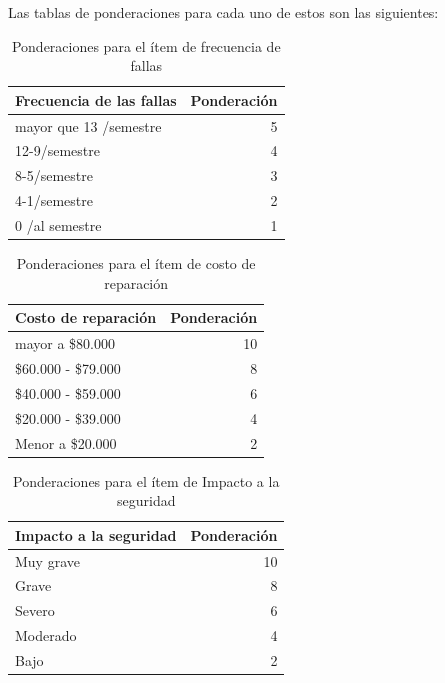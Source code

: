 Las tablas de ponderaciones para cada uno de estos son las siguientes:

\begin{table}[H]
  \centering
  
    \begin{tabular}{|l|r|}
    \hline
    Frecuencia de las fallas & \multicolumn{1}{l|}{Ponderación} \\
    \hline
    mayor que 13 /semestre & 5 \\
    \hline
    12-9/semestre & 4 \\
    \hline
    8-5/semestre & 3 \\
    \hline
    4-1/semestre & 2 \\
    \hline
    0 /al semestre & 1 \\
    \hline
    \end{tabular}%
    \caption{Ponderaciones para el ítem de frecuencia de fallas}
  \label{tab:addlabel}%
\end{table}%

\qquad\qquad%

\begin{table}[H]
  \centering
 
    \begin{tabular}{|l|r|}
    \hline
    Costo de reparación & \multicolumn{1}{l|}{Ponderación} \\
    \hline
    mayor a \$80.000 & 10 \\
    \hline
    \$60.000 - \$79.000 & 8 \\
    \hline
    \$40.000 - \$59.000 & 6 \\
    \hline
    \$20.000 - \$39.000 & 4 \\
    \hline
    Menor a \$20.000 & 2 \\
    \hline
    \end{tabular}%
    \caption{Ponderaciones para el ítem de costo de reparación}
  \label{tab:addlabel}%
\end{table}%

\begin{table}[H]
  \centering
 
    \begin{tabular}{|l|r|}
    \hline
    Impacto a la seguridad & \multicolumn{1}{l|}{Ponderación} \\
    \hline
    Muy grave & 10 \\
    \hline
    Grave & 8 \\
    \hline
    Severo  & 6 \\
    \hline
    Moderado & 4 \\
    \hline
    Bajo  & 2 \\
    \hline
    \end{tabular}%
    \caption{Ponderaciones para el ítem de Impacto a la seguridad}
  \label{tab:addlabel}%
\end{table}%

